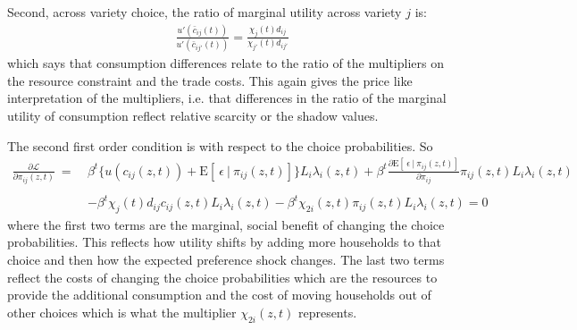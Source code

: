 \documentclass[12pt,pdftex]{article}
\begin{document}
\begin{onehalfspacing}
Second, across variety choice, the ratio of marginal utility across variety $j$ is:
\begin{align}
\frac{u'(\bar c_{ij}(t))}{u'(\bar c_{ij'}(t))} = \frac{\chi_{j}(t) d_{ij}}{\chi_{j'}(t) d_{ij'}}
\end{align}
which says that consumption differences relate to the ratio of the multipliers on the resource constraint and the trade costs. This again gives the price like interpretation of the multipliers, i.e. that differences in the ratio of the marginal utility of consumption reflect relative scarcity or the shadow values.

The second first order condition is with respect to the choice probabilities. So
\begin{align}
\frac{\partial \mathcal{L} }{\partial \pi_{ij}(z, t)} \ = \ & \beta^{t}\bigg \{  u(c_{ij}(z, t) ) + \mathrm{E}[ \ \epsilon \ | \ \pi_{ij}(z,t) ] \bigg \}L_{i} \lambda_{i}(z, t) + \beta^{t}\frac{\partial \mathrm{E}[ \ \epsilon \ | \ \pi_{ij}(z,t) ]}{\partial \pi_{ij}}\pi_{ij}(z,t) L_{i} \lambda_{i}(z, t) \nonumber \\
\nonumber \\
& - \beta^{t} \chi_{j}(t) d_{ij} c_{ij}(z, t) L_{i}\lambda_{i}(z, t) - \beta^{t} \chi_{2i}(z,t)\pi_{ij}(z,t)L_{i} \lambda_{i}(z, t)  = 0
\end{align}
where the first two terms are the marginal, social benefit of changing the choice probabilities. This reflects how utility shifts by adding more households to that choice and then how the expected preference shock changes. The last two terms reflect the costs of changing the choice probabilities which are the resources to provide the additional consumption and the cost of moving households out of other choices which is what the multiplier $\chi_{2i}(z,t)$ represents.


\end{onehalfspacing}
\end{document}
